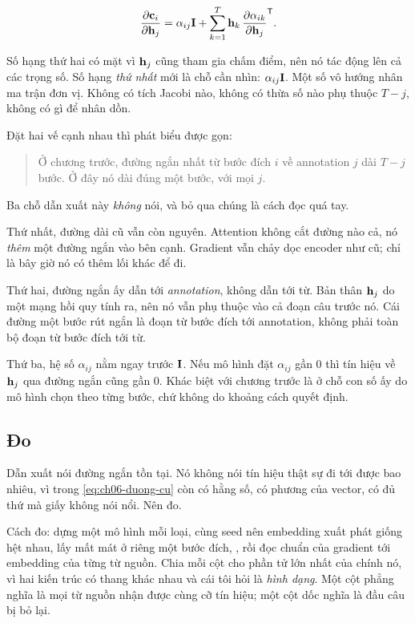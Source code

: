\begin{equation}
  \frac{\partial \mathbf{c}_i}{\partial \mathbf{h}_j}
  = \alpha_{ij} \mathbf{I}
  + \sum_{k=1}^{T} \mathbf{h}_k \, \frac{\partial \alpha_{ik}}{\partial \mathbf{h}_j}^{\mathsf{T}} .
  \label{eq:ch06-duong-moi}
\end{equation}

Số hạng thứ hai có mặt vì \(\mathbf{h}_j\) cũng tham gia chấm điểm, nên nó tác
động lên cả các trọng số. Số hạng \emph{thứ nhất} mới là chỗ cần nhìn:
\(\alpha_{ij} \mathbf{I}\). Một số vô hướng nhân ma trận đơn vị. Không có tích
Jacobi nào, không có thừa số nào phụ thuộc \(T - j\), không có gì để nhân dồn.

Đặt hai vế cạnh nhau thì phát biểu được gọn:

\begin{quote}
Ở chương trước, đường ngắn nhất từ bước đích \(i\) về annotation \(j\) dài
\(T - j\) bước. Ở đây nó dài đúng một bước, với mọi \(j\).
\end{quote}

%
Ba chỗ dẫn xuất này \emph{không} nói, và bỏ qua chúng là cách đọc quá tay.

Thứ nhất, đường dài cũ vẫn còn nguyên. Attention không cắt đường nào cả, nó
\emph{thêm} một đường ngắn vào bên cạnh. Gradient vẫn chảy dọc encoder như cũ;
chỉ là bây giờ nó có thêm lối khác để đi.

Thứ hai, đường ngắn ấy dẫn tới \emph{annotation}, không dẫn tới từ. Bản thân
\(\mathbf{h}_j\) do một mạng hồi quy tính ra, nên nó vẫn phụ thuộc vào cả đoạn
câu trước nó. Cái đường một bước rút ngắn là đoạn từ bước đích tới annotation,
không phải toàn bộ đoạn từ bước đích tới từ.

Thứ ba, hệ số \(\alpha_{ij}\) nằm ngay trước \(\mathbf{I}\). Nếu mô hình đặt
\(\alpha_{ij}\) gần 0 thì tín hiệu về \(\mathbf{h}_j\) qua đường ngắn cũng gần 0.
Khác biệt với chương trước là ở chỗ con số ấy do mô hình chọn theo từng bước,
chứ không do khoảng cách quyết định.

\subsection*{Đo}

%
Dẫn xuất nói đường ngắn tồn tại. Nó không nói tín hiệu thật sự đi tới được bao
nhiêu, vì trong \eqref{eq:ch06-duong-cu} còn có hằng số, có phương của vector,
có đủ thứ mà giấy không nói nổi. Nên đo.

Cách đo: dựng một mô hình mỗi loại, cùng seed nên embedding xuất phát giống hệt
nhau, lấy mất mát ở riêng một bước đích, ,
rồi đọc chuẩn của
gradient tới embedding của từng từ nguồn. Chia mỗi cột cho phần tử lớn nhất của
chính nó, vì hai kiến trúc có thang khác nhau và cái tôi hỏi là \emph{hình
dạng}. Một cột phẳng nghĩa là mọi từ nguồn nhận được cùng cỡ tín hiệu; một cột
dốc nghĩa là đầu câu bị bỏ lại.

